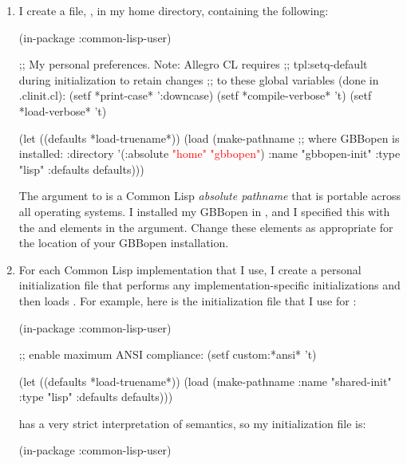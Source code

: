 \documentclass[10pt,twoside,english,pdftex]{article}
\begin{document}
\begin{enumerate}

\item I create a file, , in my home directory,
  containing the following:

\begin{example}
  (in-package :common-lisp-user)

  ;; My personal preferences.  Note: Allegro CL requires 
  ;; tpl:setq-default during initialization to retain changes
  ;; to these global variables (done in .clinit.cl):
  (setf *print-case* ':downcase)
  (setf *compile-verbose* 't)
  (setf *load-verbose* 't)

  (let ((defaults *load-truename*))
    (load (make-pathname 
           ;; where GBBopen is installed:
           :directory '(:absolute \textcolor{red}{"home" "gbbopen"})
           :name "gbbopen-init"
           :type "lisp"
           :defaults defaults)))
\end{example}

The  argument to  is a Common
Lisp \textit{absolute pathname} that is portable across all operating
systems.  I installed my GBBopen in , and I
specified this with the  and  elements in
the  argument.  Change these elements as appropriate
for the location of your GBBopen installation.

\item For each Common Lisp implementation that I use, I create a personal
  initialization file that performs any implementation-specific
  initializations and then loads .  For example, here
  is the  initialization file that I use for
  :

\begin{example}
  (in-package :common-lisp-user)

  ;; enable maximum ANSI compliance:
  (setf custom:*ansi* 't)

  (let ((defaults *load-truename*))
    (load (make-pathname 
           :name "shared-init"
           :type "lisp"
           :defaults defaults)))
\end{example}

 has a very strict interpretation
of  semantics, so my  initialization file
is:
%
\begin{example}
  (in-package :common-lisp-user)


\end{example}
\end{enumerate}
\end{document}
